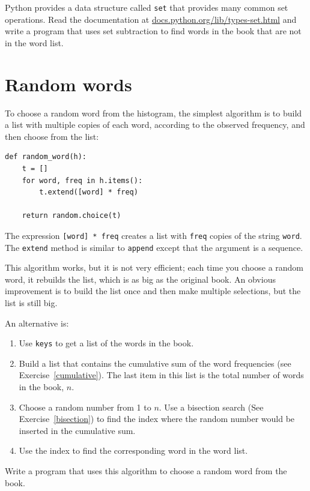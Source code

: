 \documentclass[10pt]{book}
\begin{document}
\begin{ex}


Python provides a data structure called {\tt set} that provides many
common set operations.  Read the documentation at
\url{docs.python.org/lib/types-set.html} and write a program
that uses set subtraction to find words in the book that are not in
the word list.
\end{ex}


\section{Random words}
\label{randomwords}


To choose a random word from the histogram, the simplest algorithm
is to build a list with multiple copies of each word, according
to the observed frequency, and then choose from the list:

\beforeverb
\begin{verbatim}
def random_word(h):
    t = []
    for word, freq in h.items():
        t.extend([word] * freq)

    return random.choice(t)
\end{verbatim}
\afterverb
%
The expression {\tt [word] * freq} creates a list with {\tt freq}
copies of the string {\tt word}.  The {\tt extend}
method is similar to {\tt append} except that the argument is
a sequence.

\begin{ex}
\label{randhist}


This algorithm works, but it is not very efficient; each time you
choose a random word, it rebuilds the list, which is as big as
the original book.  An obvious improvement is to build the list
once and then make multiple selections, but the list is still big.

An alternative is:

\begin{enumerate}

\item Use {\tt keys} to get a list of the words in the book.

\item Build a list that contains the cumulative sum of the word
  frequencies (see Exercise~\ref{cumulative}).  The last item
  in this list is the total number of words in the book, $n$.
  
\item Choose a random number from 1 to $n$.  Use a bisection search
  (See Exercise~\ref{bisection}) to find the index where the random
  number would be inserted in the cumulative sum.

\item Use the index to find the corresponding word in the word list.

\end{enumerate}

Write a program that uses this algorithm to choose a random
word from the book.
\end{ex}
\end{document}
